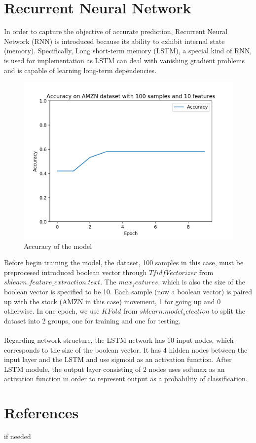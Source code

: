 \documentclass{article}
\begin{document}
\section{Recurrent Neural Network}
\indent In order to capture the objective of accurate prediction, Recurrent Neural Network (RNN) is introduced
 because its ability to exhibit internal state (memory). Specifically, Long short-term memory (LSTM),
 a special kind of RNN, is used for implementation as LSTM can deal with vanishing gradient problems
 and is capable of learning long-term dependencies.
\\
\begin{figure}
    \centering
    \includegraphics[scale=0.5]{assets/Accuracy.png}
    \caption{Accuracy of the model}
\end{figure}
Before begin training the model, the dataset, 100 samples in this case, must be preprocesed introduced
 boolean vector through $TfidfVectorizer$ from $sklearn.feature\_extraction.text$. The $max_features$, which is
 also the size of the boolean vector is specified to be 10. Each sample (now a boolean vector) is paired up with
 the stock (AMZN in this case) movement, 1 for going up and 0 otherwise. In one epoch, we use $KFold$ from
 $sklearn.model_selection$ to split the dataset into 2 groups, one for training and one for testing.
\\\\
 Regarding network structure, the LSTM network has 10 input nodes, which corresponds to the size of
 the boolean vector. It has 4 hidden nodes between the input layer and the LSTM and use sigmoid as an activation
 function. After LSTM module, the output layer consisting of 2 nodes uses softmax as an activation function in order
 to represent output as a probability of classification.
\section*{References}
if needed
\end{document}
